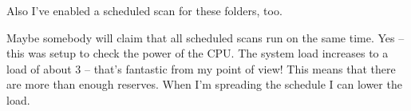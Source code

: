 Also I've enabled a scheduled scan for these folders, too.


Maybe somebody will claim that all scheduled scans run on the same time.\linebreak
Yes -- this was setup to check the power of the CPU. The system load increases
to a load of about 3 -- that's fantastic from my point of view! This means that
there are more than enough reserves. When I'm spreading the schedule I can
lower the load.

